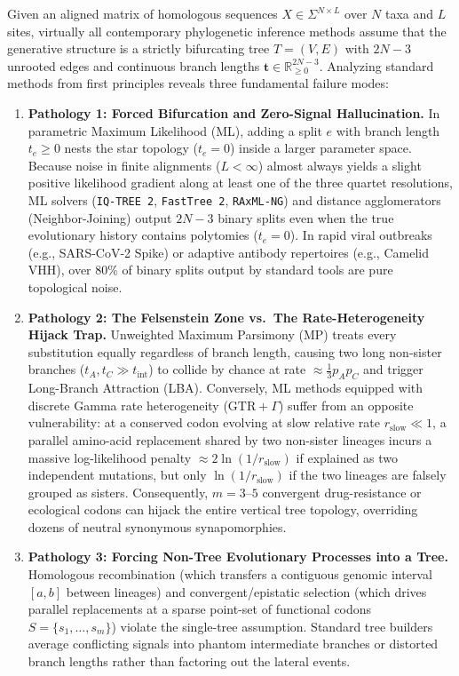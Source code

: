 \documentclass[11pt,a4paper]{article}
\begin{document}
Given an aligned matrix of homologous sequences $X \in \Sigma^{N \times L}$ over $N$ taxa and $L$ sites, virtually all contemporary phylogenetic inference methods assume that the generative structure is a strictly bifurcating tree $T = (V, E)$ with $2N-3$ unrooted edges and continuous branch lengths $\mathbf{t} \in \mathbb{R}_{\ge 0}^{2N-3}$. Analyzing standard methods from first principles reveals three fundamental failure modes:

\begin{enumerate}[leftmargin=1.8em]
    \item \textbf{Pathology 1: Forced Bifurcation and Zero-Signal Hallucination.}
    In parametric Maximum Likelihood (ML), adding a split $e$ with branch length $t_e \ge 0$ nests the star topology ($t_e = 0$) inside a larger parameter space. Because noise in finite alignments ($L < \infty$) almost always yields a slight positive likelihood gradient along at least one of the three quartet resolutions, ML solvers (\texttt{IQ-TREE 2}, \texttt{FastTree 2}, \texttt{RAxML-NG}) and distance agglomerators (Neighbor-Joining) output $2N-3$ binary splits even when the true evolutionary history contains polytomies ($t_e = 0$). In rapid viral outbreaks (e.g., SARS-CoV-2 Spike) or adaptive antibody repertoires (e.g., Camelid VHH), over $80\%$ of binary splits output by standard tools are pure topological noise.

    \item \textbf{Pathology 2: The Felsenstein Zone vs.\ The Rate-Heterogeneity Hijack Trap.}
    Unweighted Maximum Parsimony (MP) treats every substitution equally regardless of branch length, causing two long non-sister branches ($t_A, t_C \gg t_{\text{int}}$) to collide by chance at rate $\approx \frac{1}{3} p_A p_C$ and trigger Long-Branch Attraction (LBA). Conversely, ML methods equipped with discrete Gamma rate heterogeneity ($\text{GTR}+\Gamma$) suffer from an opposite vulnerability: at a conserved codon evolving at slow relative rate $r_{\text{slow}} \ll 1$, a parallel amino-acid replacement shared by two non-sister lineages incurs a massive log-likelihood penalty $\approx 2 \ln(1 / r_{\text{slow}})$ if explained as two independent mutations, but only $\ln(1 / r_{\text{slow}})$ if the two lineages are falsely grouped as sisters. Consequently, $m=3\text{--}5$ convergent drug-resistance or ecological codons can hijack the entire vertical tree topology, overriding dozens of neutral synonymous synapomorphies.

    \item \textbf{Pathology 3: Forcing Non-Tree Evolutionary Processes into a Tree.}
    Homologous recombination (which transfers a contiguous genomic interval $[a,b]$ between lineages) and convergent/epistatic selection (which drives parallel replacements at a sparse point-set of functional codons $S = \{s_1, \dots, s_m\}$) violate the single-tree assumption. Standard tree builders average conflicting signals into phantom intermediate branches or distorted branch lengths rather than factoring out the lateral events.
\end{enumerate}
\end{document}
